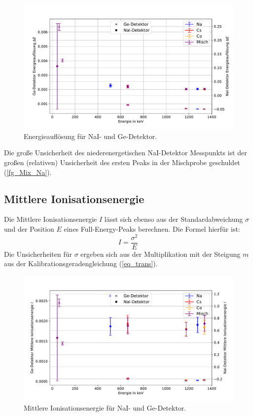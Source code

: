 \documentclass[
	a4paper,
	12pt,
	pagesize,
	ngerman
]{scrartcl}
\begin{document}
	\begin{figure}[H]
			\includegraphics[width= 1 \linewidth]{img/res}
			\caption{
			Energieauflösung für NaI- und Ge-Detektor.
			}
			\label{fg_resolution}
	\end{figure}
Die große Unsicherheit des niederenergetischen NaI-Detektor Messpunkts ist der großen (relativen) Unsicherheit des ersten Peaks in der Mischprobe geschuldet (\cref{fg_Mix_Na}).
\subsection{Mittlere Ionisationsenergie}
Die Mittlere Ionisationsenergie $I$ lässt sich ebenso aus der Standardabweichung $\sigma$ und der Position $E$ eines Full-Energy-Peaks berechnen.
Die Formel hierfür ist:
\begin{equation}
	I = \frac{\sigma^2}{E}
\end{equation}
Die Unsicherheiten für $\sigma$ ergeben sich aus der Multiplikation mit der Steigung $m$ aus der Kalibrationsgeradengleichung (\ref{eq_trans}).


	\begin{figure}[H]
			\includegraphics[width= 1 \linewidth]{img/ion}
			\caption{
			Mittlere Ionisationsenergie für NaI- und Ge-Detektor.
			}
			\label{fg_ionisation}
	\end{figure}
\end{document}

